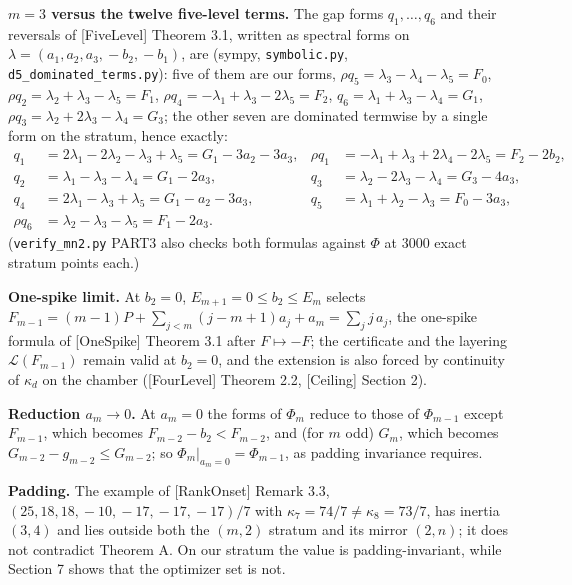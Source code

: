 \documentclass[
  11pt,
  a4paper,
]{article}
\begin{document}
\textbf{\(m=3\) versus the twelve five-level terms.} The gap forms
\(q_1,\allowbreak{}\dots,\allowbreak{}q_6\) and their reversals of {[}FiveLevel{]} Theorem 3.1,
written as spectral forms on \(\lambda=(a_1,\allowbreak{}a_2,\allowbreak{}a_3,\allowbreak{}-b_2,\allowbreak{}-b_1)\), are
(sympy, {\small\texttt{symbolic.\allowbreak{}py}}, {\small\texttt{d5\_\allowbreak{}dominated\_\allowbreak{}terms.\allowbreak{}py}}): five of
them are our forms, \(\rho q_5=\lambda_3-\lambda_4-\lambda_5=F_0\),
\(\rho q_2=\lambda_2+\lambda_3-\lambda_5=F_1\),
\(\rho q_4=-\lambda_1+\lambda_3-2\lambda_5=F_2\),
\(q_6=\lambda_1+\lambda_3-\lambda_4=G_1\),
\(\rho q_3=\lambda_2+2\lambda_3-\lambda_4=G_3\); the other seven are
dominated termwise by a single form on the stratum, hence exactly:
\[\begin{aligned}
q_1&=2\lambda_1-2\lambda_2-\lambda_3+\lambda_5=G_1-3a_2-3a_3, & \rho q_1&=-\lambda_1+\lambda_3+2\lambda_4-2\lambda_5=F_2-2b_2,\\
q_2&=\lambda_1-\lambda_3-\lambda_4=G_1-2a_3, & q_3&=\lambda_2-2\lambda_3-\lambda_4=G_3-4a_3,\\
q_4&=2\lambda_1-\lambda_3+\lambda_5=G_1-a_2-3a_3, & q_5&=\lambda_1+\lambda_2-\lambda_3=F_0-3a_3,\\
\rho q_6&=\lambda_2-\lambda_3-\lambda_5=F_1-2a_3.
\end{aligned}\] ({\small\texttt{verify\_\allowbreak{}mn2.\allowbreak{}py}} PART3 also checks both formulas
against \(\Phi\) at \(3000\) exact stratum points each.)

\textbf{One-spike limit.} At \(b_2=0\), \(E_{m+1}=0\le b_2\le E_m\)
selects \(F_{m-1}=(m-1)P+\sum_{j<m}(j-m+1)a_j+a_m=\sum_j j\,\allowbreak{}a_j\), the
one-spike formula of {[}OneSpike{]} Theorem 3.1 after \(F\mapsto-F\);
the certificate and the layering \(\mathcal L(F_{m-1})\) remain valid at
\(b_2=0\), and the extension is also forced by continuity of
\(\kappa_d\) on the chamber ({[}FourLevel{]} Theorem 2.2, {[}Ceiling{]}
Section 2).

\textbf{Reduction \(a_m\to0\).} At \(a_m=0\) the forms of \(\Phi_m\)
reduce to those of \(\Phi_{m-1}\) except \(F_{m-1}\), which becomes
\(F_{m-2}-b_2<F_{m-2}\), and (for \(m\) odd) \(G_m\), which becomes
\(G_{m-2}-g_{m-2}\le G_{m-2}\); so \(\Phi_m|_{a_m=0}=\Phi_{m-1}\), as
padding invariance requires.

\textbf{Padding.} The example of {[}RankOnset{]} Remark 3.3,
\((25,\allowbreak{}18,\allowbreak{}18,\allowbreak{}-10,\allowbreak{}-17,\allowbreak{}-17,\allowbreak{}-17)/7\) with \(\kappa_7=74/7\ne\kappa_8=73/7\),
has inertia \((3,\allowbreak{}4)\) and lies outside both the \((m,\allowbreak{}2)\) stratum and
its mirror \((2,\allowbreak{}n)\); it does not contradict Theorem A. On our stratum
the value is padding-invariant, while Section 7 shows that the optimizer
set is not.
\end{document}
